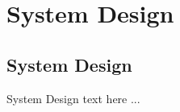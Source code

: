 \chapter{System Design} \label{chap:System Design}

\section{System Design}
System Design text here ... 
